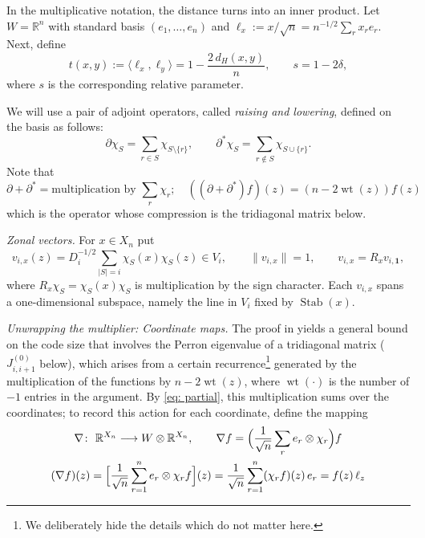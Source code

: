 \documentclass[11pt]{amsart}
\theoremstyle{plain}
\theoremstyle{remark}
\newcommand{\R}{\mathbb{R}}
\newcommand{\la}{\langle}
\newcommand{\ra}{\rangle}
\newcommand{\Stab}{\operatorname{Stab}}
\newcommand{\wt}{\operatorname{wt}}
\begin{document}
In the multiplicative notation, the distance turns into an inner product. Let $W=\R^n$ with standard basis 
$(e_1,\dots,e_n)$ and $\ell_x:=x/\sqrt n=n^{-1/2}\sum_r x_re_r$. Next, define
      \begin{equation}\label{eq: distance}   
 t(x,y):=\la\ell_x,\ell_y\ra=1-\frac{2\,d_H(x,y)}{n},\qquad s=1-2\delta ,
      \end{equation}
where $s$ is the corresponding relative parameter.

We will use a pair of adjoint operators, called \emph{raising and lowering}, defined on the basis as follows:
  $$
\partial\chi_S=\sum_{r\in S}\chi_{S\setminus\{r\}}, \qquad \partial^\ast\chi_S=\sum_{r\not\in S}
  \chi_{S\cup \{r\}}.
   $$
Note that
  \begin{equation}\label{eq: partial}
 \partial+\partial^{*}=\text{multiplication by }\textstyle\sum_r \chi_r; \quad 
 ((\partial+\partial^{*})f)(z)=(n-2\wt(z))f(z)
   \end{equation}
which is the operator whose compression is the tridiagonal matrix below.

\emph{Zonal vectors.} For $x\in X_n$ put
\begin{equation}\label{eq: zonal}
 v_{i,x}(z) = D_i^{-1/2}\sum_{|S|=i} \chi_S(x)\chi_S(z) \in V_i,
 \qquad \|v_{i,x}\|=1,\qquad v_{i,x}=R_xv_{i,\mathbf 1},
\end{equation}
where $R_x\chi_S=\chi_S(x)\chi_S$ is multiplication by the sign character.
Each $v_{i,x}$ spans a one-dimensional subspace, namely the line in $V_i$ fixed by $\Stab(x)$.

\vspace*{.1in}
\emph{Unwrapping the multiplier: Coordinate maps.} The proof in \cite{BN06} yields a general bound on the code size that involves the Perron eigenvalue of a tridiagonal matrix ($J_{i,i+1}^{(0)}$ below), which arises from a certain recurrence\footnote{We deliberately hide the details which do not matter here.} generated by the multiplication of the functions by $n-2\wt(z)$, where $\wt(\cdot)$ is the number of $-1$ entries in the argument. By \eqref{eq: partial}, this multiplication sums over the
coordinates; to record this action for each coordinate, define the mapping
  \begin{gather*}
 \nabla\colon\ \R^{X_n}\longrightarrow W\otimes\R^{X_n}, \qquad
 \nabla f=\Big(\frac1{\sqrt n}\sum_r e_r\otimes\chi_r\Big)f\\
(\nabla f)(z)
 =\Bigl[\frac1{\sqrt n}\sum_{r=1}^{n}e_r\otimes\chi_rf\Bigr](z)
=\frac1{\sqrt n}\sum_{r=1}^{n}(\chi_rf)(z)\,e_r
 =f(z)\,\ell_z 
 \end{gather*}
 
\end{document}
